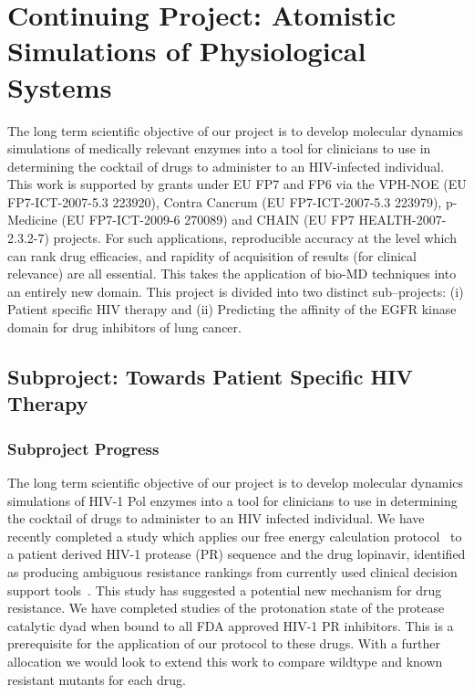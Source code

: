 \documentclass[a4paper,10pt]{article}
\begin{document}
\section{Continuing Project: Atomistic Simulations of Physiological Systems}

The long term scientific objective of our project is to develop molecular dynamics simulations of 
medically relevant enzymes into a tool for clinicians to use in determining the cocktail of drugs to 
administer to an HIV-infected individual. This work is supported by grants under EU FP7 and FP6 
via the VPH-NOE (EU FP7-ICT-2007-5.3 223920), Contra Cancrum (EU FP7-ICT-2007-5.3 223979), 
p-Medicine (EU FP7-ICT-2009-6 270089) and CHAIN (EU FP7 HEALTH-2007-2.3.2-7) projects. For such 
applications, reproducible accuracy at the level which can rank drug efficacies, and rapidity 
of acquisition of results (for clinical relevance) are all essential. This takes the application 
of bio-MD techniques into an entirely new domain. This project is divided into two distinct sub--projects:
(i) Patient specific HIV therapy and (ii) Predicting the affinity of the EGFR kinase domain for drug inhibitors of lung cancer.

\subsection{Subproject: Towards Patient Specific HIV Therapy}

\subsubsection{Subproject Progress}
The long term scientific objective of our project is to develop molecular dynamics simulations of HIV-1 Pol enzymes into a tool for clinicians to use in determining the cocktail of drugs to administer to an HIV infected individual. We have recently completed a study which applies our free energy calculation protocol~\cite{Ref2} to a patient derived HIV-1 protease (PR) sequence and the drug lopinavir, identified as producing ambiguous resistance rankings from currently used clinical decision support tools~\cite{Ref3}. This study has suggested a potential new mechanism for drug resistance. We have completed studies of the protonation state of the protease catalytic dyad when bound to all FDA approved HIV-1 PR inhibitors. This is a prerequisite for the application of our protocol to these drugs. With a further allocation we would look to extend this work to compare wildtype and known resistant mutants for each drug.
\end{document}
